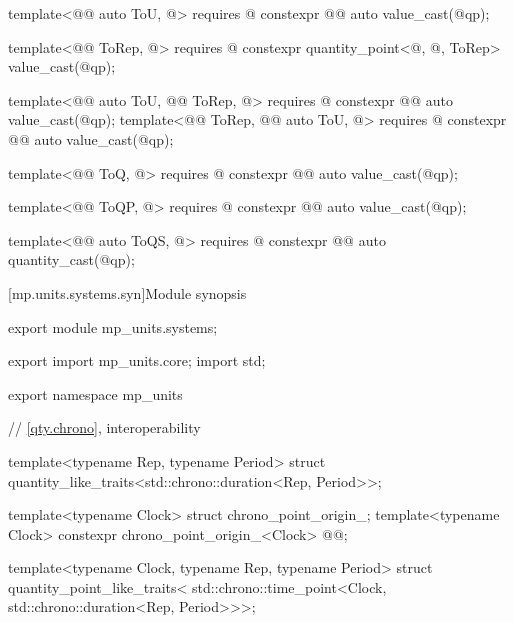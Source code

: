 \begin{codeblock}
{template<@@ auto ToU, @\seebelownc@>
  requires @\seebelownc@
constexpr @@ auto value_cast(@\seebelownc@ qp);

template<@@ ToRep, @\seebelownc@>
  requires @\seebelownc@
constexpr quantity_point<@\seebelownc@, @\seebelownc@, ToRep> value_cast(@\seebelownc@ qp);

template<@@ auto ToU, @@ ToRep, @\seebelownc@>
  requires @\seebelownc@
constexpr @@ auto value_cast(@\seebelownc@ qp);
template<@@ ToRep, @@ auto ToU, @\seebelownc@>
  requires @\seebelownc@
constexpr @@ auto value_cast(@\seebelownc@ qp);

template<@@ ToQ, @\seebelownc@>
  requires @\seebelownc@
constexpr @@ auto value_cast(@\seebelownc@ qp);

template<@@ ToQP, @\seebelownc@>
  requires @\seebelownc@
constexpr @@ auto value_cast(@\seebelownc@ qp);

template<@@ auto ToQS, @\seebelownc@>
  requires @\seebelownc@
constexpr @@ auto quantity_cast(@\seebelownc@ qp);

}
\end{codeblock}

[mp.units.systems.syn]{Module  synopsis}
%
\begin{codeblock}
export module mp_units.systems;

export import mp_units.core;
import std;

export namespace mp_units {

// \ref{qty.chrono},  interoperability

template<typename Rep, typename Period>
struct quantity_like_traits<std::chrono::duration<Rep, Period>>;

template<typename Clock>
struct chrono_point_origin_;
template<typename Clock>
constexpr chrono_point_origin_<Clock> @@{};

template<typename Clock, typename Rep, typename Period>
struct quantity_point_like_traits<
  std::chrono::time_point<Clock, std::chrono::duration<Rep, Period>>>;

}
\end{codeblock}

